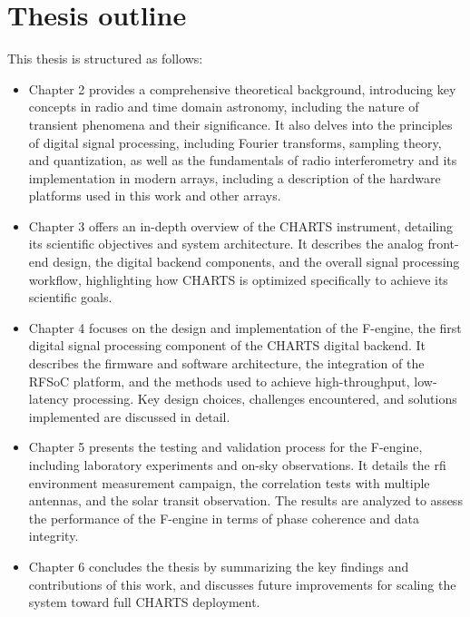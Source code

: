 \section{Thesis outline}
This thesis is structured as follows:
\begin{itemize}
    \item Chapter 2 provides a comprehensive theoretical background, introducing key concepts in radio and time domain astronomy, including the nature of transient phenomena and their significance. It also delves into the principles of digital signal processing, including Fourier transforms, sampling theory, and quantization, as well as the fundamentals of radio interferometry and its implementation in modern arrays, including a description of the hardware platforms used in this work and other arrays.
    \item Chapter 3 offers an in-depth overview of the CHARTS instrument, detailing its scientific objectives and system architecture. It describes the analog front-end design, the digital backend components, and the overall signal processing workflow, highlighting how CHARTS is optimized specifically to achieve its scientific goals.
    \item Chapter 4 focuses on the design and implementation of the F-engine, the first digital signal processing component of the CHARTS digital backend. It describes the firmware and software architecture, the integration of the RFSoC platform, and the methods used to achieve high-throughput, low-latency processing. Key design choices, challenges encountered, and solutions implemented are discussed in detail.
    \item Chapter 5 presents the testing and validation process for the F-engine, including laboratory experiments and on-sky observations. It details the \gls{rfi} environment measurement campaign, the correlation tests with multiple antennas, and the solar transit observation. The results are analyzed to assess the performance of the F-engine in terms of phase coherence and data integrity.
    \item Chapter 6 concludes the thesis by summarizing the key findings and contributions of this work, and discusses future improvements for scaling the system toward full CHARTS deployment.
\end{itemize}
